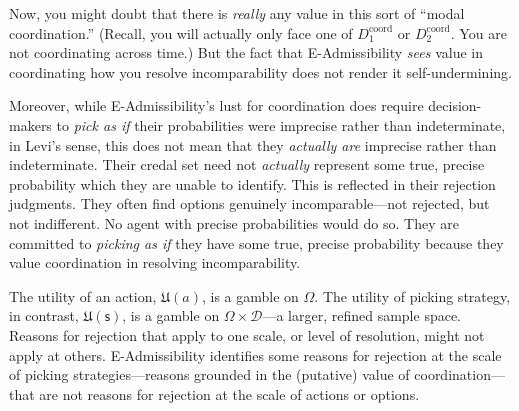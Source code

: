 \documentclass[a4paper]{article}
\newcommand\U{\mathfrak{U}} %
\newcommand{\D}{\mathcal{D}}
\newcommand\s{\mathsf{s}}
\newenvironment{CCM rewritten}
{\begingroup\color{blue}} %
{\endgroup}              %
\begin{document}
	
	
	Now, you might doubt that there is \emph{really} any value in this sort of ``modal coordination.'' (Recall, you will actually only face one of $D^{\mathrm{coord}}_1$ or $D^{\mathrm{coord}}_2$. You are not coordinating across time.) But the fact that E-Admissibility \emph{sees} value in coordinating how you resolve incomparability does not render it self-undermining.
	

Moreover, while E-Admissibility's lust for coordination does require decision-makers to \emph{pick as if} their probabilities were imprecise rather than indeterminate, in Levi's sense, this does not mean that they \emph{actually are} imprecise rather than indeterminate. Their credal set need not \emph{actually} represent some true, precise probability which they are unable to identify. This is reflected in their rejection judgments. They often find options genuinely incomparable---not rejected, but not indifferent. No agent with precise probabilities would do so. They are committed to \emph{picking as if} they have some true, precise probability because they value coordination in resolving incomparability.

The utility of an action, $\U(a)$, is a gamble on $\Omega$. The utility of picking strategy, in contrast, $\U(\s)$, is a gamble on $\Omega\times\D$---a larger, refined sample space. Reasons for rejection that apply to one scale, or level of resolution, might not apply at others. E-Admissibility identifies some reasons for rejection at the scale of picking strategies---reasons grounded in the (putative) value of coordination---that are not reasons for rejection at the scale of actions or options. 
\end{document}
